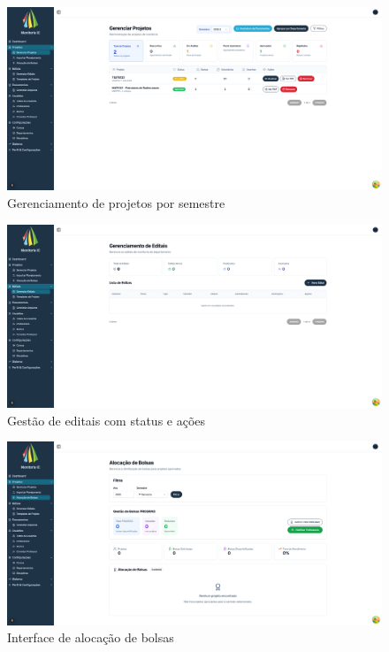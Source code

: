 \documentclass[portuguese]{sbc2025}%
\begin{document}
\begin{figure}[h!]
  \centering
  \includegraphics[width=\linewidth]{images/monitoria/admin-manage-projects.png}
  \caption{Gerenciamento de projetos por semestre}
  \label{fig:projetos}
\end{figure}

\begin{figure}[h!]
  \centering
  \includegraphics[width=\linewidth]{images/monitoria/admin-edital-management.png}
  \caption{Gestão de editais com status e ações}
  \label{fig:editais}
\end{figure}

\begin{figure}[h!]
  \centering
  \includegraphics[width=\linewidth]{images/monitoria/admin-scholarship-allocation.png}
  \caption{Interface de alocação de bolsas}
  \label{fig:bolsas}
\end{figure}
\end{document}
